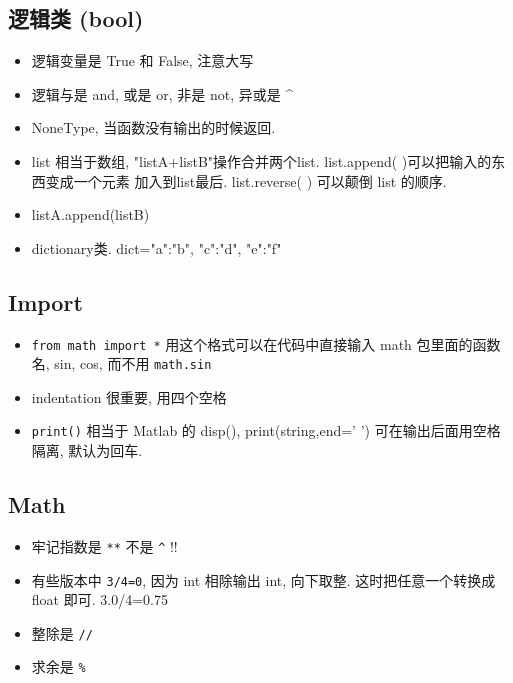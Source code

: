 \subsection{逻辑类 (bool)}
\begin{itemize}
\item 逻辑变量是 True 和 False, 注意大写
\item 逻辑与是 and, 或是 or, 非是 not, 异或是 ^

\item NoneType, 当函数没有输出的时候返回.
\item list 相当于数组, "listA+listB"操作合并两个list. list.append( )可以把输入的东西变成一个元素
    加入到list最后. list.reverse( ) 可以颠倒 list 的顺序.
\item listA.append(listB) 
\item dictionary类.  dict={"a":"b", "c":"d", "e":"f"}
\end{itemize}

\subsection{Import}
\begin{itemize}
\item \verb`from math import *` 用这个格式可以在代码中直接输入 math 包里面的函数名, sin, cos, 而不用 \verb`math.sin`
\item indentation 很重要, 用四个空格
\item \verb`print()` 相当于 Matlab 的 disp(), print(string,end=' ') 可在输出后面用空格隔离, 默认为回车. 
\end{itemize}

\subsection{Math}
\begin{itemize}
\item 牢记指数是 \verb`**` 不是 \verb`^` !!
\item 有些版本中 \verb`3/4=0`, 因为 int 相除输出 int, 向下取整. 这时把任意一个转换成float 即可. 3.0/4=0.75
\item 整除是 \verb`//`
\item 求余是 \verb`%`
\end{itemize}

